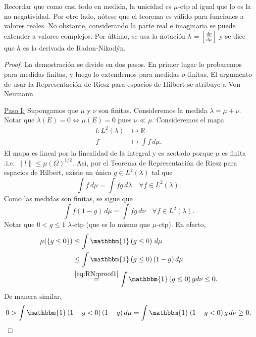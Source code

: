 \documentclass{article}
\theoremstyle{plain}
\theoremstyle{definition}
\newcommand{\1}[1]{\mathbbm{1}\left( #1 \right)}
\newcommand{\R}{\mathbb{R}}
\newcommand{\norm}[1]{\lVert #1 \rVert}
\begin{document}
Recordar que como casi todo en medida, la unicidad es \(\mu\)-ctp al igual que lo es la no negatividad. 
Por otro lado, nótese que el teorema es válido para funciones a valores reales. No obstante, considerando
la parte real e imaginaria se puede extender a valores complejos. Por último, 
se usa la notación \(h = [\frac{d\nu}{d\mu}]\) y se dice que \(h\) es la derivada de Radon-Nikodýn. 

\begin{proof}
  La demostración se divide en dos pasos. En primer lugar lo probaremos para medidas finitas, y luego
  lo extendemos para medidas \(\sigma\)-finitas. El argumento de usar la Representación de Riesz
  para espacios de Hilbert se atribuye a Von Neumann.

  \underline{Paso I:} Supongamos que \(\mu\) y \(\nu\) son finitas. Consideremos la medida
  \(\lambda = \mu + \nu\). Notar que \(\lambda(E) = 0 \iff \mu(E) = 0\) pues \(\nu \ll \mu\).
  Consideremos el mapa 
  \begin{align*}
    l \colon L^{2}(\lambda) &\mapsto \R\\
    f &\mapsto \int f \, d\mu.
  \end{align*}
  El mapa es lineal por la linealidad de la integral y es acotado porque \(\mu\) es finita
  .i.e. \(\norm{l} \le \mu(\Omega)^{1/2}\). Así, por el Teorema de Representación de Riesz para 
  espacios de Hilbert, existe un único \(g\in L^{2}(\lambda)\) tal que
  \begin{displaymath}
    \int f \, d\mu = \int fg\, d\lambda
    \quad\forall f\in L^2(\lambda).
  \end{displaymath}
  Como las medidas son finitas, se sigue que
  \begin{equation}\label{eq:RN:proof1}
    \int f(1-g)\, d\mu = \int fg \, d\nu
    \quad\forall f\in L^2(\lambda).
  \end{equation}
  Notar que \(0 < g \le 1\) \(\lambda\)-ctp (que es lo mismo que \(\mu\)-ctp). En efecto,
  \begin{align*}
    \mu(\left\{ g \le 0 \right\})
    &\le
    \int \1{g \le 0} \, d\mu
    \\&\le
    \int \1{g \le 0} (1-g) \, d\mu
    \\&\overset{\eqref{eq:RN:proof1}}{=}
    \int \1{g \le 0} g d\nu
    \le 0.
  \end{align*}
  De manera similar,
  \begin{displaymath}
    0 >
    \int \1{1-g < 0} (1-g) \, d\mu
    =
    \int \1{1-g < 0} g \, d\nu
    \ge 0.
  \end{displaymath}

\end{proof}
\end{document}
